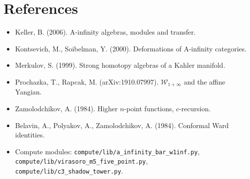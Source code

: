 \documentclass[11pt]{article}
\begin{document}
\section{References}

\begin{itemize}
\item Keller, B. (2006). A-infinity algebras, modules and transfer.
\item Kontsevich, M., Soibelman, Y. (2000). Deformations of A-infinity
categories.
\item Merkulov, S. (1999). Strong homotopy algebras of a Kahler
manifold.
\item Prochazka, T., Rapcak, M. (arXiv:1910.07997). $\mathcal{W}_{1+\infty}$
and the affine Yangian.
\item Zamolodchikov, A. (1984). Higher $n$-point functions, $c$-recursion.
\item Belavin, A., Polyakov, A., Zamolodchikov, A. (1984). Conformal
Ward identities.
\item Compute modules:
\texttt{compute/lib/a\_infinity\_bar\_w1inf.py},
\texttt{compute/lib/virasoro\_m5\_five\_point.py},
\texttt{compute/lib/c3\_shadow\_tower.py}.
\end{itemize}
\end{document}
